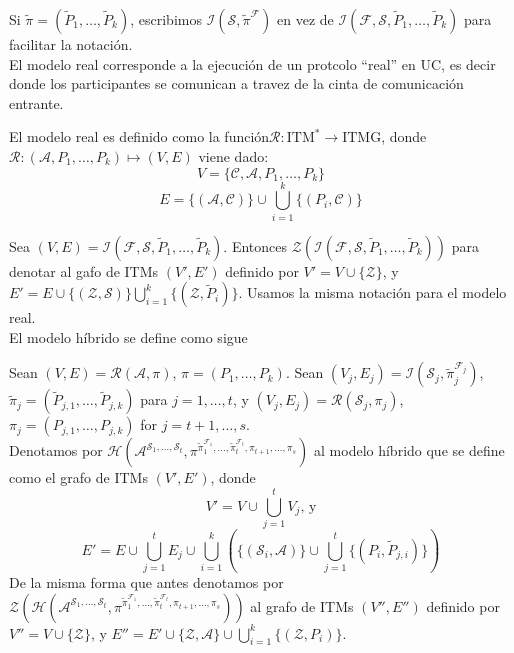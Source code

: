 Si $\tilde{\pi} = (\tilde{P}_1, \ldots, \tilde{P}_k)$, escribimos
$\mathcal{I}(\mathcal{S}, \tilde{\pi}^\mathcal{F})$ en vez de $\mathcal{I}(\mathcal{F},
\mathcal{S}, \tilde{P}_1, \ldots, \tilde{P}_k)$ para facilitar la notación.\\

El modelo real corresponde a la ejecución de un protcolo ``real'' en UC, es decir
donde los participantes se comunican a travez de la cinta de comunicación entrante.

\begin{definicion}
El modelo real es definido como la función$\mathcal{R}:\textrm{ITM}^* \to \textrm{ITMG}$,
donde $\mathcal{R}:(\mathcal{A}, P_1, \ldots, P_k) \mapsto (V, E)$ viene dado:
$$V = \{\mathcal{C}, \mathcal{A}, P_1, \ldots, P_k\}$$
$$E = \{(\mathcal{A}, \mathcal{C})\}\cup\bigcup_{i=1}^k\{(P_i, \mathcal{C})\}$$
\end{definicion}

Sea $(V, E) = \mathcal{I}(\mathcal{F}, \mathcal{S}, \tilde{P}_1, \ldots, \tilde{P}_k)$.
Entonces $\mathcal{Z}(\mathcal{I}(\mathcal{F}, \mathcal{S}, \tilde{P}_1, \ldots,
\tilde{P}_k))$ para denotar al gafo de ITMs $(V', E')$ definido por $V' = V \cup \{\mathcal{Z}\}$,
y $E' = E \cup \{(\mathcal{Z}, \mathcal{S})\} \bigcup_{i=1}^k \{(\mathcal{Z}, \tilde{P}_i)\}$.
Usamos la misma notación para el modelo real.\\

El modelo híbrido se define como sigue

\begin{definicion}
Sean
$(V, E) = \mathcal{R}(\mathcal{A}, \pi)$, $\pi = (P_1, \ldots, P_k)$.
Sean $(V_j, E_j) =
\mathcal{I}(\mathcal{S}_j,
            \tilde{\pi}^{\mathcal{F}_j}_j)$,
$\tilde{\pi}_j = (\tilde{P}_{j, 1}, \ldots, \tilde{P}_{j, k})$ para $j = 1, \ldots, t$,
y $(V_j, E_j) = \mathcal{R}(\mathcal{S}_j,\pi_j)$,
$\pi_j = (P_{j, 1}, \ldots, P_{j, k})$ for $j = t+1, \ldots, s$.\\
Denotamos por
$\mathcal{H}(
    \mathcal{A}^{
        \mathcal{S}_1,
        \ldots,
        \mathcal{S}_t},
    \pi^{
        \tilde{\pi}_1^{\mathcal{F}_1},
        \ldots,
        \tilde{\pi}_t^{\mathcal{F}_t},
        \pi_{t+1},
        \ldots,
        \pi_s})$
al modelo híbrido que se define como el grafo de ITMs $(V', E')$, donde
$$V' = V \cup \bigcup_{j=1}^t V_j \textrm{, y}$$
$$E' = 
    E
    \cup
    \bigcup_{j=1}^t E_j
    \cup
    \bigcup_{i=1}^k
        \left(
            \{(\mathcal{S}_i, \mathcal{A})\}
            \cup
            \bigcup_{j=1}^t \{(P_i, \tilde{P}_{j, i})\}
        \right)$$
De la misma forma que antes denotamos por
$\mathcal{Z}(
    \mathcal{H}(
        \mathcal{A}^{
            \mathcal{S}_1,
            \ldots,
            \mathcal{S}_t},
        \pi^{
            \tilde{\pi}_1^{\mathcal{F}_1},
            \ldots,
            \tilde{\pi}_t^{\mathcal{F}_t},
            \pi_{t+1},
            \ldots,
            \pi_s}))$
al grafo de ITMs $(V'', E'')$ definido por
$V'' = V \cup \{\mathcal{Z}\}$,
y
$E'' = 
    E'
    \cup
    \{\mathcal{Z}, \mathcal{A}\}
    \cup 
    \bigcup_{i=1}^k \{(\mathcal{Z}, P_i)\}$.
\end{definicion}

